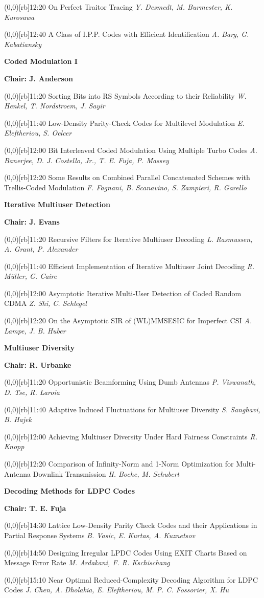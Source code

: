 \documentclass[a5paper,twoside]{article}
\def\period#1{\flushleft{\large\bfseries #1}\markboth{\sf #1}{\sf #1}}
\def\sesstitle#1{\vspace{.45\bigskipamount}\par{\bfseries #1}\par}
\def\sesschair#1{{\bfseries Chair: #1}\par\vspace{.65\medskipamount}}
\def\papertime#1{\makebox(0,0)[rb]{{\scriptsize #1}\hspace{.5em}}}
\def\papertitle#1{#1\hfil\break}
\def\paperauthors#1{{\itshape #1}\par\filbreak\vspace{.65\medskipamount}}
\begin{document}
\papertime{12:20}%
\papertitle{On Perfect Traitor Tracing}
\paperauthors{Y. Desmedt, M. Burmester, K. Kurosawa}
\papertime{12:40}%
\papertitle{A Class of I.P.P. Codes with Efficient Identification}
\paperauthors{A. Barg, G. Kabatiansky}
\sesstitle{Coded Modulation I}
\sesschair{J. Anderson}
\papertime{11:20}%
\papertitle{Sorting Bits into RS Symbols According to their Reliability}
\paperauthors{W. Henkel, T. Nordstroem, J. Sayir}
\papertime{11:40}%
\papertitle{Low-Density Parity-Check Codes for Multilevel Modulation}
\paperauthors{E. Eleftheriou, S. Oelcer}
\papertime{12:00}%
\papertitle{Bit Interleaved Coded Modulation Using Multiple Turbo Codes}
\paperauthors{A. Banerjee, D. J. Costello, Jr., T. E. Fuja, P. Massey}
\papertime{12:20}%
\papertitle{Some Results on Combined Parallel Concatenated Schemes with Trellis-Coded Modulation}
\paperauthors{F. Fagnani, B. Scanavino, S. Zampieri, R. Garello}
\sesstitle{Iterative Multiuser Detection}
\sesschair{J. Evans}
\papertime{11:20}%
\papertitle{Recursive Filters for Iterative Multiuser Decoding}
\paperauthors{L. Rasmussen, A. Grant, P. Alexander}
\papertime{11:40}%
\papertitle{Efficient Implementation of Iterative Multiuser Joint Decoding}
\paperauthors{R. M\"uller, G. Caire}
\papertime{12:00}%
\papertitle{Asymptotic Iterative Multi-User Detection of Coded Random CDMA}
\paperauthors{Z. Shi, C. Schlegel}
\papertime{12:20}%
\papertitle{On the Asymptotic SIR of (WL)MMSESIC for Imperfect CSI}
\paperauthors{A. Lampe, J. B. Huber}
\sesstitle{Multiuser Diversity}
\sesschair{R. Urbanke}
\papertime{11:20}%
\papertitle{Opportunistic Beamforming Using Dumb Antennas}
\paperauthors{P. Viswanath, D. Tse, R. Laroia}
\papertime{11:40}%
\papertitle{Adaptive Induced Fluctuations for Multiuser Diversity}
\paperauthors{S. Sanghavi, B. Hajek}
\papertime{12:00}%
\papertitle{Achieving Multiuser Diversity Under Hard Fairness Constraints}
\paperauthors{R. Knopp}
\papertime{12:20}%
\papertitle{Comparison of Infinity-Norm and 1-Norm Optimization for Multi-Antenna Downlink Transmission}
\paperauthors{H. Boche, M. Schubert}
\period{Fri 14:30 -- 15:50}
\sesstitle{Decoding Methods for LDPC Codes}
\sesschair{T. E. Fuja}
\papertime{14:30}%
\papertitle{Lattice Low-Density Parity Check Codes and their Applications in Partial Response Systems}
\paperauthors{B. Vasic, E. Kurtas, A. Kuznetsov}
\papertime{14:50}%
\papertitle{Designing Irregular LPDC Codes Using EXIT Charts Based on Message Error Rate}
\paperauthors{M. Ardakani, F. R. Kschischang}
\papertime{15:10}%
\papertitle{Near Optimal Reduced-Complexity Decoding Algorithm for LDPC Codes}
\paperauthors{J. Chen, A. Dholakia, E. Eleftheriou, M. P. C. Fossorier, X. Hu}
\end{document}
